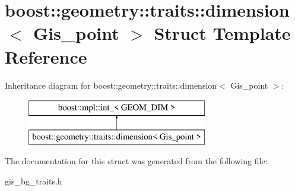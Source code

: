 \hypertarget{structboost_1_1geometry_1_1traits_1_1dimension_3_01Gis__point_01_4}{}\section{boost\+:\+:geometry\+:\+:traits\+:\+:dimension$<$ Gis\+\_\+point $>$ Struct Template Reference}
\label{structboost_1_1geometry_1_1traits_1_1dimension_3_01Gis__point_01_4}
Inheritance diagram for boost\+:\+:geometry\+:\+:traits\+:\+:dimension$<$ Gis\+\_\+point $>$\+:\begin{figure}[H]
\begin{center}
\leavevmode
\includegraphics[height=2.000000cm]{structboost_1_1geometry_1_1traits_1_1dimension_3_01Gis__point_01_4}
\end{center}
\end{figure}


The documentation for this struct was generated from the following file\+:\begin{DoxyCompactItemize}
\item 
gis\+\_\+bg\+\_\+traits.\+h\end{DoxyCompactItemize}
